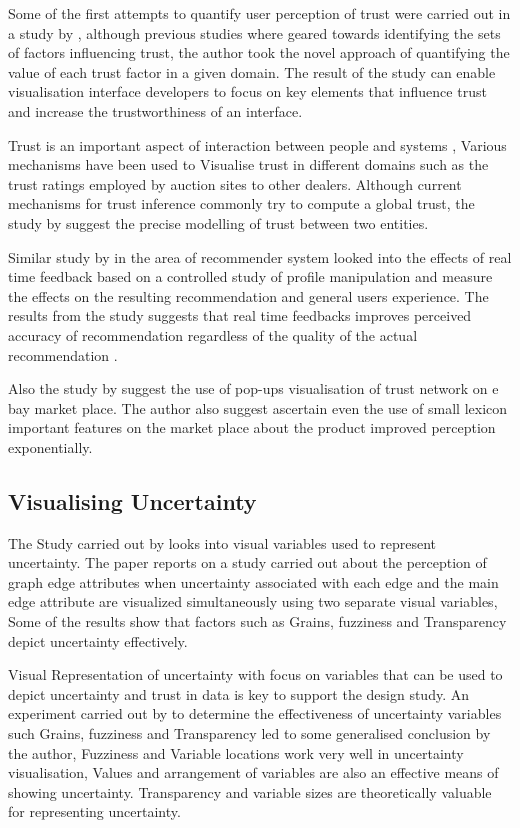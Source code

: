 \documentclass[journal]{vgtc}                %
\begin{document}
Some of the first attempts to quantify user perception of trust were carried out in a study by \cite{trust-perception}, although previous studies where geared towards identifying the sets of factors influencing trust, the author took the novel approach of quantifying the value of each trust factor in a given domain. The result of the study can enable visualisation interface developers to focus on key elements that influence trust and increase the trustworthiness of an interface. 

Trust is an important aspect of interaction between people and systems \cite{fuzzy-trust}, Various mechanisms have been used to Visualise trust in different domains such as the trust ratings employed by auction sites to other dealers. Although current mechanisms for trust inference commonly try to compute a global trust, the study by \cite{fuzzy-trust} suggest the precise modelling of trust between two entities.  

Similar study by \cite{recommender-study} in the area of recommender system looked into the effects of real time feedback based on a controlled study of profile manipulation and measure the effects on the resulting recommendation and general users experience. The results from the study suggests that real time feedbacks improves perceived accuracy of recommendation regardless of the quality of the actual recommendation \cite{recommender-study}. 

Also the study by \cite{trust-relationships} suggest the use of pop-ups visualisation of trust network on e bay market place. The author also suggest ascertain even the use of small lexicon important features on the market place about the product improved perception exponentially.  

\subsection{Visualising Uncertainty}
The Study carried out by \cite{uncertainty-graphedges} looks into visual variables used to represent uncertainty. 
The paper reports on a study carried out about the perception of graph edge attributes when uncertainty associated with each edge and the main edge attribute are visualized simultaneously using two separate visual variables, Some of the results show that factors such as Grains, fuzziness and Transparency depict uncertainty effectively.

Visual Representation of uncertainty with focus on variables that can be used to depict uncertainty and trust in data is key to support the design study. An experiment carried out by \cite{visualising-uncertainty} to determine the effectiveness of uncertainty variables such Grains, fuzziness and Transparency led to some generalised conclusion by the author, Fuzziness and Variable locations work very well in uncertainty visualisation, Values and arrangement of variables are also an effective means of showing uncertainty. Transparency and variable sizes are theoretically valuable for representing uncertainty.
\end{document}
